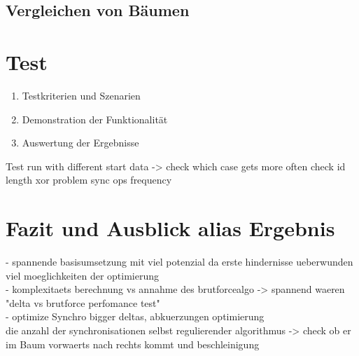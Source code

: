 \documentclass[a4paper,11pt,oneside,%
headsepline,												%
footsepline,												%
bibtotocnumbered									%
]{scrreprt}
\begin{document}
\section{Vergleichen von Bäumen}

\chapter{Test}
		\begin{enumerate}[1.]
			\item Testkriterien und Szenarien
			\item Demonstration der Funktionalität
			\item Auswertung der Ergebnisse
		\end{enumerate}
		
Test run with different start data -> check which case gets more often
check id length xor problem
sync ops frequency		
\chapter{Fazit und Ausblick alias Ergebnis}

- spannende basisumsetzung mit viel potenzial da erste hindernisse ueberwunden viel moeglichkeiten der optimierung\\
- komplexitaets berechnung vs annahme des brutforcealgo -> spannend waeren "delta vs brutforce perfomance test"\\
- optimize Synchro bigger deltas, abkuerzungen optimierung\\

die anzahl der synchronisationen selbst regulierender algorithmus -> check ob er im Baum vorwaerts nach rechts kommt und beschleinigung\\
\newpage
\listoftodos[Notes]

\newpage
\printbibheading
\printbibliography[type=book,heading=subbibliography,title={Buch Quellen}]
\printbibliography[nottype=book,heading=subbibliography,title={Andere Quellen}]
\end{document}
